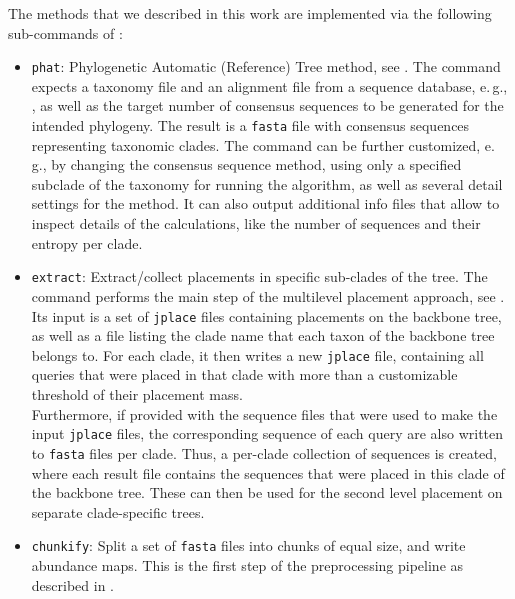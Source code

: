 The methods that we described in this work are implemented via the following sub-commands of :

\begin{itemize}
    \item \texttt{phat}: Phylogenetic Automatic (Reference) Tree method, see .
          The command expects a taxonomy file and an alignment file from a sequence database,
          e.\,g.,  \cite{Quast2013,Yilmaz2014},
          as well as the target number of consensus sequences to be generated for the intended phylogeny.
          The result is a \texttt{fasta} file with consensus sequences representing taxonomic clades.
          The command can be further customized, e.\,g., by changing the consensus sequence method,
          using only a specified subclade of the taxonomy for running the algorithm,
          as well as several detail settings for the method.
          It can also output additional info files that allow to inspect details of the calculations,
          like the number of sequences and their entropy per clade.
    \item \texttt{extract}: Extract/collect placements in specific sub-clades of the tree.
          The command performs the main step of the multilevel placement approach,
          see .
          Its input is a set of \texttt{jplace} files containing placements on the backbone tree,
          as well as a file listing the clade name that each taxon of the backbone tree belongs to.
          For each clade, it then writes a new \texttt{jplace} file,
          containing all queries that were placed in that clade with more than a customizable threshold
          of their placement mass.
          \\
          Furthermore, if provided with the sequence files that were used to make the input \texttt{jplace} files,
          the corresponding sequence of each query are also written to \texttt{fasta} files per clade.
          Thus, a per-clade collection of sequences is created, where each result file contains the sequences
          that were placed in this clade of the backbone tree.
          These can then be used for the second level placement on separate clade-specific trees.
    \item \texttt{chunkify}: Split a set of \texttt{fasta} files into chunks of equal size,
          and write abundance maps.
          This is the first step of the preprocessing pipeline as described in .

\end{itemize}
